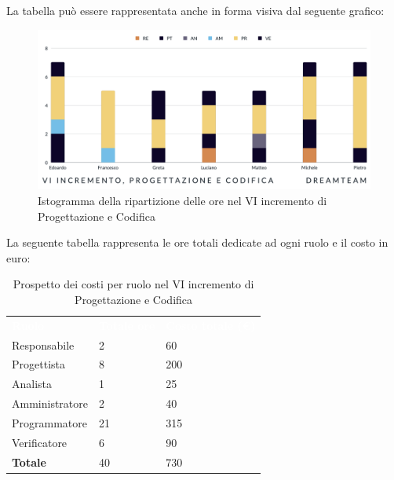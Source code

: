 La tabella può essere rappresentata anche in forma visiva dal seguente grafico:
\begin{figure}[H]
\centering
\includegraphics[scale=0.55]{Sezioni/SezioniPreventivo/grafici/Preventivo_progettazione_VI.png}
\caption{Istogramma della ripartizione delle ore nel VI incremento di Progettazione e Codifica}
\end{figure}

La seguente tabella rappresenta le ore totali dedicate ad ogni ruolo e il costo in euro:

\begin{table}[H]
\begin{center}
\renewcommand{\arraystretch}{1.5}
\begin{tabular}{ m{}<{\centering}  m{}<{\centering} m{}<{\centering}}
	\rowcolor{darkblue}
	\textcolor{white}{\textbf{Ruolo}}&\textcolor{white}{\textbf{Totale ore}}&\textcolor{white}{\textbf{Costo totale (\euro)}}\\ 

	Responsabile  & 2 & 60 \\	
	
	Progettista & 8 & 200 \\
	
	Analista & 1 & 25 \\

	Amministratore & 2 & 40 \\
	
	Programmatore & 21 & 315 \\
	
	Verificatore & 6 & 90 \\
	
	\textbf{Totale} & 40 & 730 \\
	
\end{tabular}
\caption{Prospetto dei costi per ruolo nel VI incremento di Progettazione e Codifica}
\end{center}
\end{table}

